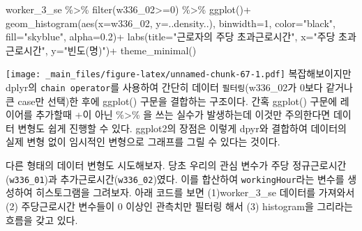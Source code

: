 \documentclass[
]{book}
\newenvironment{Shaded}{\begin{snugshade}}{\end{snugshade}}
\newcommand{\AttributeTok}[1]{\textcolor[rgb]{0.77,0.63,0.00}{#1}}
\newcommand{\DecValTok}[1]{\textcolor[rgb]{0.00,0.00,0.81}{#1}}
\newcommand{\FloatTok}[1]{\textcolor[rgb]{0.00,0.00,0.81}{#1}}
\newcommand{\FunctionTok}[1]{\textcolor[rgb]{0.00,0.00,0.00}{#1}}
\newcommand{\NormalTok}[1]{#1}
\newcommand{\SpecialCharTok}[1]{\textcolor[rgb]{0.00,0.00,0.00}{#1}}
\newcommand{\StringTok}[1]{\textcolor[rgb]{0.31,0.60,0.02}{#1}}
\theoremstyle{definition}
\theoremstyle{definition}
\theoremstyle{definition}
\theoremstyle{definition}
\theoremstyle{remark}
\begin{document}
\begin{Shaded}
\begin{Highlighting}[]
\NormalTok{worker\_3\_se }\SpecialCharTok{\%\textgreater{}\%} 
  \FunctionTok{filter}\NormalTok{(w336\_02}\SpecialCharTok{\textgreater{}=}\DecValTok{0}\NormalTok{) }\SpecialCharTok{\%\textgreater{}\%} 
  \FunctionTok{ggplot}\NormalTok{()}\SpecialCharTok{+}
  \FunctionTok{geom\_histogram}\NormalTok{(}\FunctionTok{aes}\NormalTok{(}\AttributeTok{x=}\NormalTok{w336\_02, }\AttributeTok{y=}\NormalTok{..density..), }\AttributeTok{binwidth=}\DecValTok{1}\NormalTok{, }\AttributeTok{color=}\StringTok{"black"}\NormalTok{, }\AttributeTok{fill=}\StringTok{"skyblue"}\NormalTok{, }\AttributeTok{alpha=}\FloatTok{0.2}\NormalTok{)}\SpecialCharTok{+}
  \FunctionTok{labs}\NormalTok{(}\AttributeTok{title=}\StringTok{"근로자의 주당 초과근로시간"}\NormalTok{, }\AttributeTok{x=}\StringTok{"주당 초과근로시간"}\NormalTok{, }\AttributeTok{y=}\StringTok{"빈도(명)"}\NormalTok{)}\SpecialCharTok{+}
  \FunctionTok{theme\_minimal}\NormalTok{()}
\end{Highlighting}
\end{Shaded}

\texttt{[image: \_main\_files/figure-latex/unnamed-chunk-67-1.pdf]}
복잡해보이지만 dplyr의 \texttt{chain\ operator}를 사용하여 간단히 데이터 \texttt{필터링}(w336\_02가 0보다 같거나 큰 case만 선택)한 후에 ggplot() 구문을 결합하는 구조이다. 간혹 ggplot() 구문에 레이어를 추가할때 +이 아닌 \%\textgreater\% 을 쓰는 실수가 발생하는데 이것만 주의한다면 데이터 변형도 쉽게 진행할 수 있다. ggplot2의 장점은 이렇게 dpyr와 결합하여 데이터의 실제 변형 없이 임시적인 변형으로 그래프를 그릴 수 있다는 것이다.

다른 형태의 데이터 변형도 시도해보자. 당초 우리의 관심 변수가 주당 정규근로시간(\texttt{w336\_01})과 추가근로시간(\texttt{w336\_02})였다. 이를 합산하여 \texttt{workingHour}라는 변수를 생성하여 히스토그램을 그려보자. 아래 코드를 보면 (1)worker\_3\_se 데이터를 가져와서 (2) 주당근로시간 변수들이 0 이상인 관측치만 필터링 해서 (3) histogram을 그리라는 흐름을 갖고 있다.
\end{document}
